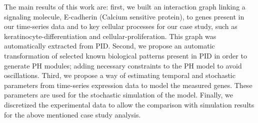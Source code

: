 The main  results of this work are: first, we built an interaction graph linking a signaling molecule, 
E-cadherin (Calcium sensitive protein), to genes present in our time-series data and to key cellular processes for our case study, such as 
keratinocyte-differentiation and cellular-proliferation.  This graph was automatically extracted from PID. Second, we propose an automatic                                     %
transformation of selected known biological patterns present in  PID in order to generate PH modules;
 adding necessary constraints to the PH model to avoid oscillations.  
Third, we propose a way of estimating temporal and stochastic parameters from time-series expression data to 
model the measured genes.  These parameters are used for the stochastic simulation of the model.  Finally, 
we discretized the experimental data to allow the comparison with simulation results for the above mentioned case 
study analysis. 


 
